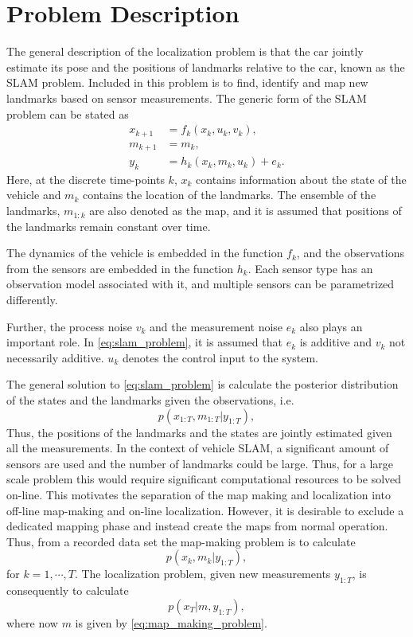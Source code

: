 \section{Problem Description}


The general description of the localization problem is that the car
jointly estimate its pose and the positions of landmarks relative to
the car, known as the \gls{SLAM} problem. Included in this problem is
to find, identify and map new landmarks based on sensor
measurements. The generic form of the \gls{SLAM} problem can be stated
as
\begin{subequations}\label{eq:slam_problem}
  \begin{align}
    x_{k+1} & = f_k(x_k, u_k,v_k), \\
    m_{k+1} & = m_k, \\
    y_k & = h_k(x_k, m_k, u_k) + e_k.
  \end{align}
\end{subequations}
Here, at the discrete time-points $k$, $x_k$ contains information about
the state of the vehicle and $m_k$ contains the location of the
landmarks. The ensemble of the landmarks, $m_{1:k}$ are also denoted as the map,
and it is assumed that positions of the landmarks remain constant over
time.

The dynamics of the vehicle is embedded in the function $f_k$, and the observations from the sensors are embedded in the function $h_k$. Each sensor type has an observation model associated with it, and multiple sensors can be parametrized differently. 

Further, the process noise $v_k$ and the measurement noise $e_k$ also plays an important role. In \eqref{eq:slam_problem}, it is assumed that $e_k$ is additive and $v_k$ not necessarily additive. $u_k$ denotes the control input to the system.

The general solution to \eqref{eq:slam_problem} is calculate the posterior distribution of the states and the landmarks given the observations, i.e.
\begin{equation}\label{eq:posterior}
p(x_{1:T}, m_{1:T} | y_{1:T}),
\end{equation}
Thus, the positions of the landmarks and the states are jointly
estimated given all the measurements. In the context of vehicle \gls{SLAM}, a significant amount of sensors are used and the number of landmarks could be large. Thus, for a large scale problem this would require significant computational resources to be solved on-line. This motivates the separation of the map making and
localization into off-line map-making and on-line localization. However, it is desirable to exclude a dedicated mapping phase and instead create the maps from normal operation. Thus, from a recorded data set the map-making problem is to calculate
\begin{equation}\label{eq:map_making_problem}
p(x_{k}, m_{k} | y_{1:T}),
\end{equation}
for $k = 1, \cdots, T$. The localization problem, given new measurements $y_{1:T}$, is consequently to calculate 
$$
p(x_{T}| m ,  y_{1:T}),
$$
where now $m$ is given by \eqref{eq:map_making_problem}.

